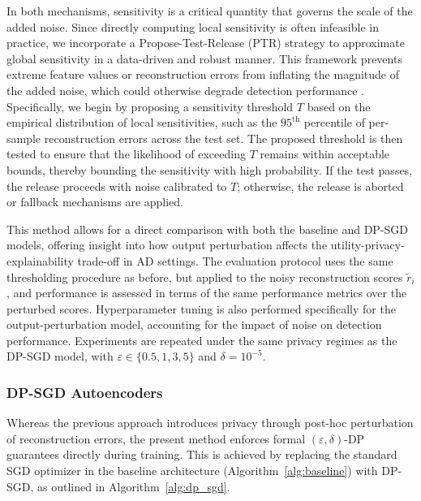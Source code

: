 In both mechanisms, sensitivity is a critical quantity that governs the scale of the added noise. Since directly computing local sensitivity is often infeasible in practice, we incorporate a Propose-Test-Release (PTR) strategy to approximate global sensitivity in a data-driven and robust manner. This framework prevents extreme feature values or reconstruction errors from inflating the magnitude of the added noise, which could otherwise degrade detection performance \citep[pg.~143-149]{dwork2014algorithmic}. Specifically, we begin by proposing a sensitivity threshold \(T\) based on the empirical distribution of local sensitivities, such as the \(95^{\text{th}}\) percentile of per-sample reconstruction errors across the test set. The proposed threshold is then tested to ensure that the likelihood of exceeding \(T\) remains within acceptable bounds, thereby bounding the sensitivity with high probability. If the test passes, the release proceeds with noise calibrated to \(T\); otherwise, the release is aborted or fallback mechanisms are applied. 

This method allows for a direct comparison with both the baseline and DP-SGD models, offering insight into how output perturbation affects the utility-privacy-explainability trade-off in AD settings. The evaluation protocol uses the same thresholding procedure as before, but applied to the noisy reconstruction scores $\tilde{r}_i$, and performance is assessed in terms of the same performance metrics over the perturbed scores. Hyperparameter tuning is also performed specifically for the output-perturbation model, accounting for the impact of noise on detection performance. Experiments are repeated under the same privacy regimes as the DP-SGD model, with $\varepsilon \in \{0.5,1, 3, 5\}$ and $\delta = 10^{-5}$.

\subsubsection{DP-SGD Autoencoders}

Whereas the previous approach introduces privacy through post-hoc perturbation of reconstruction errors, the present method enforces formal \((\varepsilon, \delta)\)-DP guarantees directly during training. This is achieved by replacing the standard SGD optimizer in the baseline architecture (Algorithm~\ref{alg:baseline}) with DP-SGD, as outlined in Algorithm~\ref{alg:dp_sgd}.

